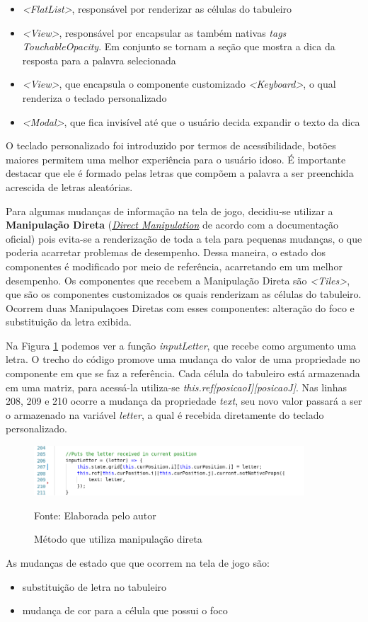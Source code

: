 \begin{itemize}
    \item \textit{<FlatList>}, responsável por renderizar as células do tabuleiro
    \item \textit{<View>}, responsável por encapsular as também nativas \textit{tags} \textit{TouchableOpacity}. Em conjunto se tornam a seção que mostra a dica da resposta para a palavra selecionada 
    \item \textit{<View>}, que encapsula o componente customizado \textit{<Keyboard>}, o qual renderiza o teclado personalizado
    \item \textit{<Modal>}, que fica invisível até que o usuário decida expandir o texto da dica
\end{itemize}

O teclado personalizado foi introduzido por termos de acessibilidade, botões maiores permitem uma melhor experiência para o usuário idoso. É importante destacar que ele é formado pelas letras que compõem a palavra a ser preenchida acrescida de letras aleatórias.

Para algumas mudanças de informação na tela de jogo, decidiu-se utilizar a \textbf{Manipulação Direta} (\href{https://reactnative.dev/docs/direct-manipulation}{\textit{Direct Manipulation}} de acordo com a documentação oficial) pois evita-se a renderização de toda a tela para pequenas mudanças, o que poderia acarretar problemas de desempenho. Dessa maneira, o estado dos componentes é modificado por meio de referência, acarretando em um melhor desempenho. Os componentes que recebem a Manipulação Direta são \textit{<Tiles>}, que são os componentes customizados os quais renderizam as células do tabuleiro. Ocorrem duas Manipulaçoes Diretas com esses componentes: alteração do foco e substituição da letra exibida.

Na Figura \ref{fig:codeDirectManipulation} podemos ver a função \textit{inputLetter}, que recebe como argumento uma letra. O trecho do código promove uma mudança do valor de uma propriedade no componente em que se faz a referência. Cada célula do tabuleiro está armazenada em uma matriz, para acessá-la utiliza-se \textit{this.ref[posicaoI][posicaoJ]}. Nas linhas 208, 209 e 210 ocorre a mudança da propriedade \textit{text}, seu novo valor passará a ser o armazenado na variável \textit{letter}, a qual é recebida diretamente do teclado personalizado.

\begin{figure}[H]
\centering
    \caption{Método que utiliza manipulação direta}
    \label{fig:codeDirectManipulation}
    \includegraphics[width=0.9\textwidth]{Figuras/codeDirectManipulation.png}
    
    Fonte: Elaborada pelo autor
\end{figure}

As mudanças de estado que que ocorrem na tela de jogo são:

\begin{itemize}
    \item substituição de letra no tabuleiro
    \item mudança de cor para a célula que possui o foco
\end{itemize}